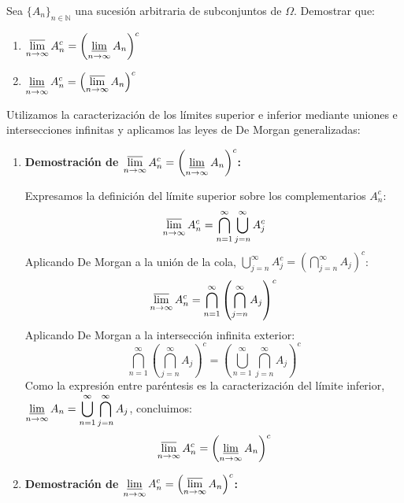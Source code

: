 \begin{problema}
Sea $\{A_n\}_{n \in \mathbb{N}}$ una sucesión arbitraria de subconjuntos de $\Omega$. Demostrar que:
\begin{enumerate}[label=\alph*)]
    \item $\displaystyle \varlimsup_{n \to \infty} A_n^c = \left( \varliminf_{n \to \infty} A_n \right)^c$
    \item $\displaystyle \varliminf_{n \to \infty} A_n^c = \left( \varlimsup_{n \to \infty} A_n \right)^c$
\end{enumerate}

\tcblower

Utilizamos la caracterización de los límites superior e inferior mediante uniones e intersecciones infinitas y aplicamos las leyes de De Morgan generalizadas:

\begin{enumerate}[label=\alph*)]
    \item \textbf{Demostración de $\displaystyle \varlimsup_{n \to \infty} A_n^c = \left( \varliminf_{n \to \infty} A_n \right)^c$:}
    
    Expresamos la definición del límite superior sobre los complementarios $A_n^c$:
    \[
        \varlimsup_{n \to \infty} A_n^c = \bigcap_{n=1}^\infty \bigcup_{j=n}^\infty A_j^c
    \]
    Aplicando De Morgan a la unión de la cola, $\bigcup_{j=n}^\infty A_j^c = \left( \bigcap_{j=n}^\infty A_j \right)^c$:
    \[
        \varlimsup_{n \to \infty} A_n^c = \bigcap_{n=1}^\infty \left( \bigcap_{j=n}^\infty A_j \right)^c
    \]
    Aplicando De Morgan a la intersección infinita exterior:
    \[
        \bigcap_{n=1}^\infty \left( \bigcap_{j=n}^\infty A_j \right)^c = \left( \bigcup_{n=1}^\infty \bigcap_{j=n}^\infty A_j \right)^c
    \]
    Como la expresión entre paréntesis es la caracterización del límite inferior, $\displaystyle \varliminf_{n \to \infty} A_n = \bigcup_{n=1}^\infty \bigcap_{j=n}^\infty A_j$, concluimos:
    \[
        \varlimsup_{n \to \infty} A_n^c = \left( \varliminf_{n \to \infty} A_n \right)^c
    \]

    \item \textbf{Demostración de $\displaystyle \varliminf_{n \to \infty} A_n^c = \left( \varlimsup_{n \to \infty} A_n \right)^c$:}
    

\end{enumerate}
\end{problema}
